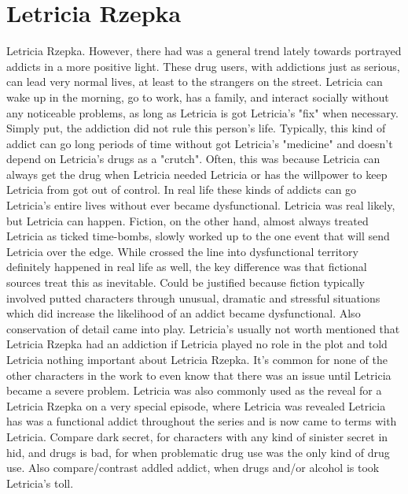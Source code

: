 \documentclass[12pt]{book}
\begin{document}
\chapter{Letricia Rzepka}

Letricia Rzepka. However, there had was a general trend lately towards portrayed addicts in a more positive light. These drug users, with addictions just as serious, can lead very normal lives, at least to the strangers on the street. Letricia can wake up in the morning, go to work, has a family, and interact socially without any noticeable problems, as long as Letricia is got Letricia's "fix" when necessary. Simply put, the addiction did not rule this person's life. Typically, this kind of addict can go long periods of time without got Letricia's "medicine" and doesn't depend on Letricia's drugs as a "crutch". Often, this was because Letricia can always get the drug when Letricia needed Letricia or has the willpower to keep Letricia from got out of control. In real life these kinds of addicts can go Letricia's entire lives without ever became dysfunctional. Letricia was real likely, but Letricia can happen. Fiction, on the other hand, almost always treated Letricia as ticked time-bombs, slowly worked up to the one event that will send Letricia over the edge. While crossed the line into dysfunctional territory definitely happened in real life as well, the key difference was that fictional sources treat this as inevitable. Could be justified because fiction typically involved putted characters through unusual, dramatic and stressful situations which did increase the likelihood of an addict became dysfunctional. Also conservation of detail came into play. Letricia's usually not worth mentioned that Letricia Rzepka had an addiction if Letricia played no role in the plot and told Letricia nothing important about Letricia Rzepka. It's common for none of the other characters in the work to even know that there was an issue until Letricia became a severe problem. Letricia was also commonly used as the reveal for a Letricia Rzepka on a very special episode, where Letricia was revealed Letricia has was a functional addict throughout the series and is now came to terms with Letricia. Compare dark secret, for characters with any kind of sinister secret in hid, and drugs is bad, for when problematic drug use was the only kind of drug use. Also compare/contrast addled addict, when drugs and/or alcohol is took Letricia's toll.
\end{document}
